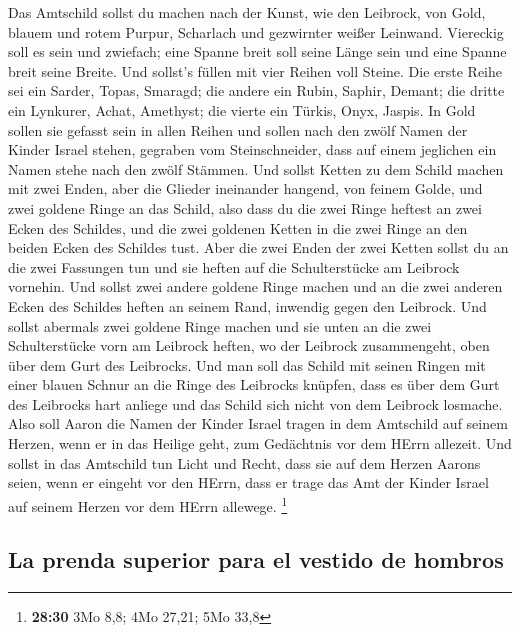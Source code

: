  Das Amtschild sollst du machen nach der Kunst, wie den
Leibrock, von Gold, blauem und rotem Purpur, Scharlach und gezwirnter
weißer Leinwand.  Viereckig soll es sein und zwiefach;
eine Spanne breit soll seine Länge sein und eine Spanne breit seine
Breite.  Und sollst's füllen mit vier Reihen voll Steine.
Die erste Reihe sei ein Sarder, Topas, Smaragd;  die
andere ein Rubin, Saphir, Demant;  die dritte ein
Lynkurer, Achat, Amethyst;  die vierte ein Türkis, Onyx,
Jaspis. In Gold sollen sie gefasst sein in allen Reihen 
und sollen nach den zwölf Namen der Kinder Israel stehen, gegraben vom
Steinschneider, dass auf einem jeglichen ein Namen stehe nach den zwölf
Stämmen.  Und sollst Ketten zu dem Schild machen mit zwei
Enden, aber die Glieder ineinander hangend, von feinem Golde,
 und zwei goldene Ringe an das Schild, also dass du die
zwei Ringe heftest an zwei Ecken des Schildes,  und die
zwei goldenen Ketten in die zwei Ringe an den beiden Ecken des Schildes
tust.  Aber die zwei Enden der zwei Ketten sollst du an
die zwei Fassungen tun und sie heften auf die Schulterstücke am Leibrock
vornehin.  Und sollst zwei andere goldene Ringe machen
und an die zwei anderen Ecken des Schildes heften an seinem Rand,
inwendig gegen den Leibrock.  Und sollst abermals zwei
goldene Ringe machen und sie unten an die zwei Schulterstücke vorn am
Leibrock heften, wo der Leibrock zusammengeht, oben über dem Gurt des
Leibrocks.  Und man soll das Schild mit seinen Ringen mit
einer blauen Schnur an die Ringe des Leibrocks knüpfen, dass es über dem
Gurt des Leibrocks hart anliege und das Schild sich nicht von dem
Leibrock losmache.  Also soll Aaron die Namen der Kinder
Israel tragen in dem Amtschild auf seinem Herzen, wenn er in das Heilige
geht, zum Gedächtnis vor dem HErrn allezeit.  Und sollst
in das Amtschild tun Licht und Recht, dass sie auf dem Herzen Aarons
seien, wenn er eingeht vor den HErrn, dass er trage das Amt der Kinder
Israel auf seinem Herzen vor dem HErrn allewege. \footnote{\textbf{28:30}
  3Mo 8,8; 4Mo 27,21; 5Mo 33,8}

\hypertarget{la-prenda-superior-para-el-vestido-de-hombros}{%
\subsection{La prenda superior para el vestido de
hombros}\label{la-prenda-superior-para-el-vestido-de-hombros}}

